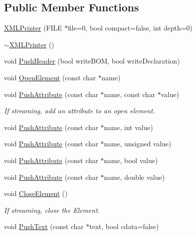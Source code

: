 \subsection*{Public Member Functions}
\begin{DoxyCompactItemize}
\item 
\hyperlink{classtinyxml2_1_1_x_m_l_printer_aa6d3841c069085f5b8a27bc7103c04f7}{X\-M\-L\-Printer} (F\-I\-L\-E $\ast$file=0, bool compact=false, int depth=0)
\item 
\hyperlink{classtinyxml2_1_1_x_m_l_printer_a6de4c23a2941bd738a97b2bfd0000514}{$\sim$\-X\-M\-L\-Printer} ()
\item 
void \hyperlink{classtinyxml2_1_1_x_m_l_printer_a178c608ce8476043d5d6513819cde903}{Push\-Header} (bool write\-B\-O\-M, bool write\-Declaration)
\item 
void \hyperlink{classtinyxml2_1_1_x_m_l_printer_aa10d330818dbc31b44e9ffc27618bdfb}{Open\-Element} (const char $\ast$name)
\item 
void \hyperlink{classtinyxml2_1_1_x_m_l_printer_a9a4e2c9348b42e147629d5a99f4af3f0}{Push\-Attribute} (const char $\ast$name, const char $\ast$value)
\begin{DoxyCompactList}\small\item\em If streaming, add an attribute to an open element. \end{DoxyCompactList}\item 
void \hyperlink{classtinyxml2_1_1_x_m_l_printer_a69120c82088597372d28d0a98f2ee7a1}{Push\-Attribute} (const char $\ast$name, int value)
\item 
void \hyperlink{classtinyxml2_1_1_x_m_l_printer_aa41039e51990aaf5342f3e0575a692c4}{Push\-Attribute} (const char $\ast$name, unsigned value)
\item 
void \hyperlink{classtinyxml2_1_1_x_m_l_printer_a51f7950d7b7a19f0d3a0d549a318d45f}{Push\-Attribute} (const char $\ast$name, bool value)
\item 
void \hyperlink{classtinyxml2_1_1_x_m_l_printer_a1714867af40e68ca404c3e84b6cac2a6}{Push\-Attribute} (const char $\ast$name, double value)
\item 
void \hyperlink{classtinyxml2_1_1_x_m_l_printer_aed6cce4bd414a78b3e2a824803c3ec42}{Close\-Element} ()
\begin{DoxyCompactList}\small\item\em If streaming, close the Element. \end{DoxyCompactList}\item 
void \hyperlink{classtinyxml2_1_1_x_m_l_printer_a1cc16a9362df4332012cb13cff6441b3}{Push\-Text} (const char $\ast$text, bool cdata=false)

\end{DoxyCompactItemize}
